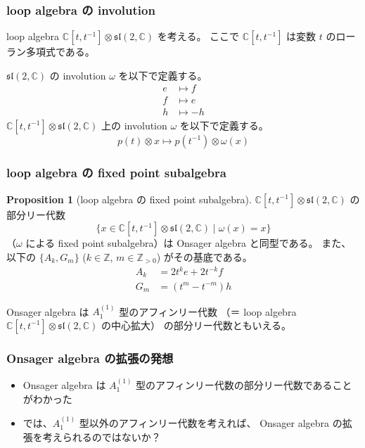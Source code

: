 \documentclass{beamer}
\theoremstyle{definition}
\newtheorem{proposition}{Proposition}
\begin{document}
\begin{frame}
    \frametitle{loop algebra の involution}

    loop algebra \(\mathbb{C}[t,t^{-1}] \otimes \mathfrak{sl}(2,\mathbb{C})\) を考える。
    ここで \(\mathbb{C}[t,t^{-1}]\) は変数 \(t\) のローラン多項式である。

    \begin{definition}
        \(\mathfrak{sl}(2,\mathbb{C})\) の involution \(\omega \) を以下で定義する。
        \begin{align*}
            e & \mapsto f  \\
            f & \mapsto e  \\
            h & \mapsto -h
        \end{align*}
        \(\mathbb{C}[t,t^{-1}] \otimes \mathfrak{sl}(2,\mathbb{C})\) 上の
        involution \(\omega \) を以下で定義する。
        \[
            p(t) \otimes x \mapsto p(t^{-1}) \otimes \omega(x)
        \]
    \end{definition}
\end{frame}

\begin{frame}
    \frametitle{loop algebra の fixed point subalgebra}

    \begin{proposition}[loop algebra の fixed point subalgebra]
        \(\mathbb{C}[t,t^{-1}] \otimes \mathfrak{sl}(2,\mathbb{C})\) の部分リー代数
        \[
            \{ x \in \mathbb{C}[t,t^{-1}] \otimes \mathfrak{sl}(2,\mathbb{C}) \mid \omega(x) = x \}
        \]
        （\(\omega \) による fixed point subalgebra）は Onsager algebra と同型である。
        また、以下の \( \{A_k, G_m\} \) (\( k \in \mathbb{Z} \), \( m \in \mathbb{Z}_{>0} \)) がその基底である。
        \begin{align*}
            A_k & = 2t^k e + 2t^{-k} f \\
            G_m & = (t^m - t^{-m}) h
        \end{align*}
    \end{proposition}

    Onsager algebra は \(A_1^{(1)}\) 型のアフィンリー代数
    （＝ loop algebra \(\mathbb{C}[t,t^{-1}] \otimes \mathfrak{sl}(2,\mathbb{C})\) の中心拡大）
    の部分リー代数ともいえる。
\end{frame}

\begin{frame}
    \frametitle{Onsager algebra の拡張の発想}

    \begin{itemize}
        \item Onsager algebra は \(A_1^{(1)}\) 型のアフィンリー代数の部分リー代数であることがわかった
        \item では、\(A_1^{(1)}\) 型以外のアフィンリー代数を考えれば、
              Onsager algebra の拡張を考えられるのではないか？
    \end{itemize}
\end{frame}
\end{document}
